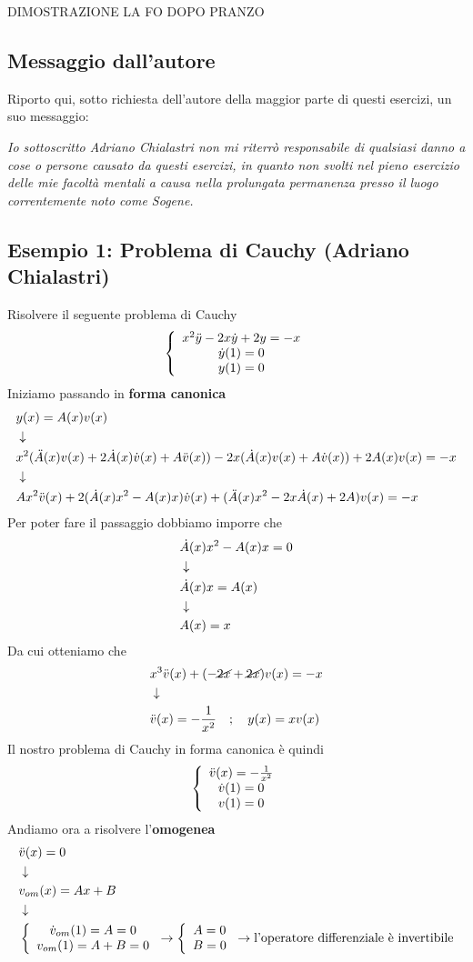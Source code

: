 DIMOSTRAZIONE LA FO DOPO PRANZO

\newpage

\subsection{Messaggio dall'autore}

Riporto qui, sotto richiesta dell'autore della maggior parte di questi esercizi, un suo messaggio:

\textit{Io sottoscritto Adriano Chialastri non mi riterrò responsabile di qualsiasi danno a cose o persone causato da questi esercizi, in quanto non svolti nel pieno esercizio delle mie facoltà mentali a causa nella prolungata permanenza presso il luogo correntemente noto come Sogene.
}

\subsection{Esempio 1: Problema di Cauchy (Adriano Chialastri) \label{canon}}
Risolvere il seguente problema di Cauchy
\begin{align}
	\left\{ \begin{array}{ccc} x^2 \ddot{y} - 2x \dot{y} + 2y = -x\\ \dot{y}(1)=0\\ y(1)=0 \end{array} \right.
\end{align}
Iniziamo passando in \textbf{forma canonica}
\begin{align}
	&y(x) = A(x)v(x)	\\ &\downarrow \nonumber \\
	&x^2 (\ddot{A}(x)v(x) + 2\dot{A}(x)\dot{v}(x) + A \ddot{v}(x)) - 2x (\dot{A}(x)v(x) + A \dot{v}(x)) + 2A(x)v(x) = -x \nonumber \\ &\downarrow \nonumber \\
	&Ax^2 \ddot{v}(x) + 2(\dot{A}(x) x^2 - A(x)x) \dot{v}(x) + (\ddot{A}(x) x^2 - 2x\dot{A}(x) +2A)v(x) = -x	
\end{align}
Per poter fare il passaggio dobbiamo imporre che
\begin{align}
	&\dot{A}(x) x^2 - A(x)x = 0 \\ &\downarrow \nonumber \\
	&\dot{A}(x) x = A(x) \nonumber \\ &\downarrow \nonumber \\
	&A(x) = x  
\end{align}
Da cui otteniamo che
\begin{align}
	&x^3 \ddot{v}(x) + (-\cancel{2x} +\cancel{2x})v(x) = -x	\\ &\downarrow \nonumber \\
	&\ddot{v}(x) = -\frac{1}{x^2} \quad ; \quad y(x) = x v(x)
\end{align}
Il nostro problema di Cauchy in forma canonica è quindi
\begin{align}
	\left\{ \begin{array}{ccc} \ddot{v}(x) = -\frac{1}{x^2}\\ \dot{v}(1)=0\\ v(1)=0 \end{array} \right.
\end{align}
Andiamo ora a risolvere l'\textbf{omogenea}
\begin{align}
	&\ddot{v}(x) = 0 \\ &\downarrow \nonumber \\
	&v_{om}(x) = Ax + B  \label{kekwdiff1}\\ &\downarrow \nonumber \\
	&\left\{ \begin{array}{cc} \dot{v}_{om}(1)=A=0\\ v_{om}(1)=A+B=0 \end{array} \right. \to \left\{ \begin{array}{cc} A=0\\ B=0 \end{array} \right. \to \text{l'operatore differenziale è invertibile} 
\end{align}
